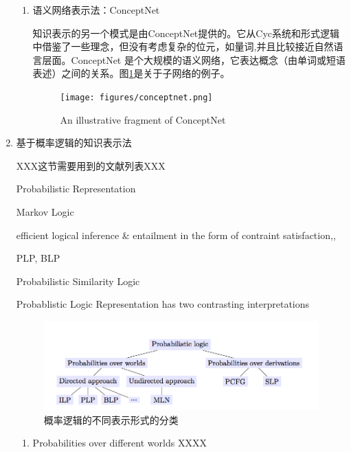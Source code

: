 \begin{enumerate}
\begin{enumerate}
\item[3)] 语义网络表示法：ConceptNet \cite{Robert2012}

知识表示的另一个模式是由ConceptNet提供的\cite{Liu2004}。它从Cyc系统和形式逻辑中借鉴了一些理念，但没有考虑复杂的位元，如量词,并且比较接近自然语言层面。ConceptNet 是个大规模的语义网络，它表达概念（由单词或短语表述）之间的关系。图\ref{fig:concept}是关于子网络的例子。

\begin{figure}[htb]
\centering
\texttt{[image: figures/conceptnet.png]}
\caption{ An illustrative fragment of ConceptNet }
\label{fig:concept}
\end{figure}


\end{enumerate}

\item {基于概率逻辑的知识表示法}

XXX这节需要用到的文献列表XXX

Probabilistic Representation \cite{Poon2009}

Markov Logic\cite{Domingos2007}

efficient logical inference & entailment in the form of contraint satisfaction\cite{Giordani2010a},\cite{Giordani2010b}, \cite{Giordani2009}

PLP, BLP\cite{Kersting2007}

Probabilistic Similarity Logic\cite{Brocheler2012}

Probablistic Logic Representation has two contrasting interpretations\cite{DaRaett2003}




\begin{figure}[htb]
\centering
\includegraphics[width=12cm]{figures/plr-relation.png}
\caption{概率逻辑的不同表示形式的分类}
\label{fig:plr-relation}
\end{figure}

\begin{enumerate}

\item[1)] Probabilities over different worlds
XXXX


\end{enumerate}
\end{enumerate}
